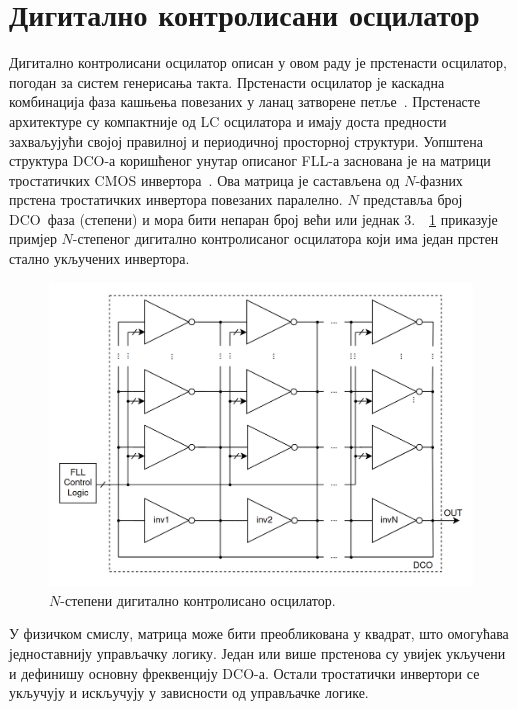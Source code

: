 \documentclass[master]{finthesis}
\def \FLL  {FLL} %
\def \DCO  {DCO} %
\begin{document}
\section{Дигитално контролисани осцилатор} \label{DCO chapter}
Дигитално контролисани осцилатор описан у овом раду је прстенасти осцилатор, погодан за систем генерисања такта. Прстенасти осцилатор је каскадна комбинација фаза кашњења повезаних у ланац затворене петље~\cite{Madhusudhana:283751064}. Прстенасте архитектуре су компактније од LC осцилатора и имају доста предности захваљујући својој правилној и периодичној просторној структури. Уопштена структура \DCO-а коришћеног унутар описаног \FLL-а заснована је на матрици тростатичких CMOS инвертора~\cite{Terosiet:340277809}. Ова матрица је састављена од $N$-фазних прстена тростатичких инвертора повезаних паралелно. $N$ представља број \DCO\ фаза (степени) и мора бити непаран број већи или једнак 3.~\figurename~\ref{dco_1} приказује примјер $N$-степеног дигитално контролисаног осцилатора који има један прстен стално укључених инвертора. \par
\begin{figure}[!ht]
	 \centering
	 \includegraphics[scale=0.25]{slike/dco_1.png}
	 \caption{$N$-степени дигитално контролисано осцилатор.}
	 \label{dco_1}
\end{figure}
У физичком смислу, матрица може бити преобликована у квадрат, што омогућава једноставнију управљачку логику. Један или више прстенова су увијек укључени и дефинишу основну фреквенцију \DCO-а. Остали тростатички инвертори се укључују и искључују у зависности од управљачке логике. \par
\end{document}
